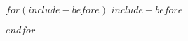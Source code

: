 \documentclass[fontsize=12pt,DIV10,paper=a4,twoside=false]{scrartcl}
\title{\pstTitel}
\author{\pstVonAutor}
\begin{document}
$for(include-before)$
$include-before$

$endfor$
\end{document}
